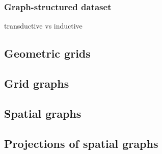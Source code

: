 \documentclass{article}
\theoremstyle{definition}
\theoremstyle{remark}
\theoremstyle{plain}
\begin{document}
\subsubsection{Graph-structured dataset}
\label{transductive_graph}

transductive vs inductive

\subsection{Geometric grids}

\subsection{Grid graphs}

\subsection{Spatial graphs}

\subsection{Projections of spatial graphs}
\end{document}

